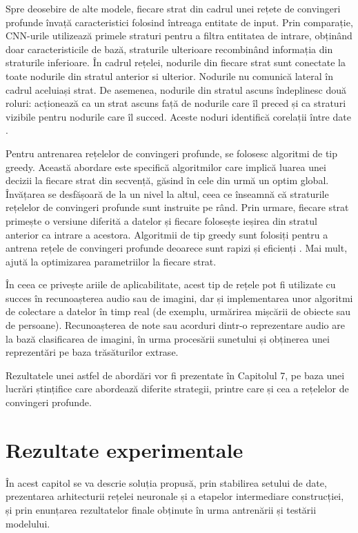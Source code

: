 \documentclass[a4paper,12pt]{report}
\begin{document}
Spre deosebire de alte modele, fiecare strat din cadrul unei rețete de convingeri profunde 
învață caracteristici folosind întreaga entitate de input. Prin comparație, CNN-urile 
utilizează primele straturi pentru a filtra entitatea de intrare, obținând doar 
caracteristicile de bază, straturile ulterioare recombinând 
informația din straturile inferioare. În cadrul rețelei, nodurile din fiecare strat sunt conectate la toate nodurile 
din stratul anterior si ulterior. Nodurile nu comunică lateral în cadrul aceluiași strat. 
De asemenea, nodurile din stratul ascuns îndeplinesc două roluri: acționează 
ca un strat ascuns față de nodurile care îl preced și ca straturi vizibile 
pentru nodurile care îl succed. Aceste noduri identifică corelații între date \cite{WEBSITE:conv2d-working-cnn}. 

Pentru antrenarea rețelelor de convingeri profunde,  
se folosesc algoritmi de tip greedy. Această abordare este specifică algoritmilor 
care implică luarea unei decizii la fiecare strat din secvență, găsind în cele 
din urmă un optim global. Învățarea se desfășoară de la un nivel la altul, 
ceea ce înseamnă că straturile rețelelor de convingeri profunde sunt instruite pe rând. 
Prin urmare, fiecare strat primește o versiune diferită a datelor și 
fiecare folosește ieșirea din stratul anterior ca intrare a acestora. 
Algoritmii de tip greedy sunt folosiți pentru a antrena rețele de convingeri profunde
deoarece sunt rapizi și eficienți \cite{WEBSITE:conv2d-working-cnn}. 
Mai mult, ajută la optimizarea parametriilor la fiecare strat.

În ceea ce privește ariile de aplicabilitate, acest tip de rețele pot fi utilizate 
cu succes în recunoașterea audio sau de imagini, dar și implementarea unor 
algoritmi de colectare a datelor în timp real (de exemplu, urmărirea mișcării
de obiecte sau de persoane). Recunoașterea de note sau acorduri dintr-o reprezentare audio 
are la bază clasificarea de imagini, în urma procesării sunetului și obținerea unei 
reprezentări pe baza trăsăturilor extrase. 

Rezultatele unei astfel de abordări 
vor fi prezentate în Capitolul 7, pe baza unei lucrări 
ștințifice care abordează diferite strategii, printre care și cea a rețelelor de 
convingeri profunde.

\chapter{Rezultate experimentale}
În acest capitol se va descrie soluția 
propusă, prin stabilirea setului de date, prezentarea 
arhitecturii rețelei neuronale și a etapelor intermediare construcției, și prin 
enunțarea rezultatelor finale obținute în urma antrenării și testării modelului.
\end{document}
